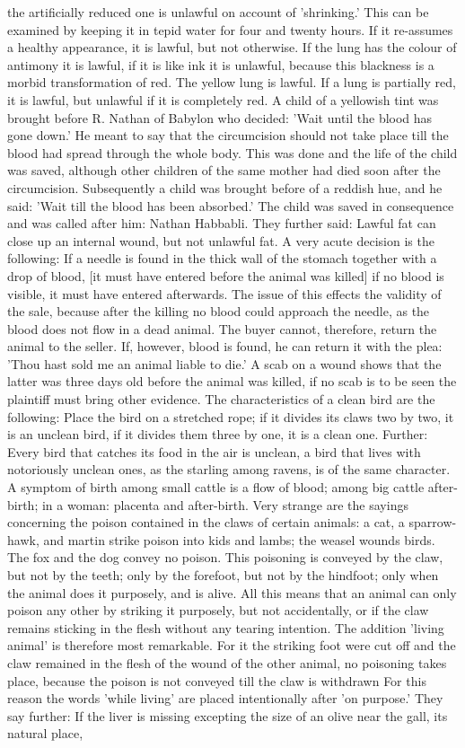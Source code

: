\documentclass[12pt]{article}
\begin{document}
the artificially reduced one is unlawful on account of 'shrinking.' This can be examined by keeping it in tepid water for four and twenty hours. If it re-assumes a healthy appearance, it is lawful, but not otherwise. If the lung has the colour of antimony it is lawful, if it is like ink it is unlawful, because this blackness is a morbid transformation of red. The yellow lung is lawful. If a lung is partially red, it is lawful, but unlawful if it is completely red. A child of a yellowish tint was brought before R. Nathan of Babylon who decided: 'Wait until the blood has gone down.' He meant to say that the circumcision should not take place till the blood had spread through the whole body. This was done and the life of the child was saved, although other children of the same mother had died soon after the circumcision. Subsequently a child was brought before of a reddish hue, and he said: 'Wait till the blood has been absorbed.' The child was saved in consequence and was called after him: Nathan Habbabli. They further said: Lawful fat can close up an internal wound, but not unlawful fat. A very acute decision is the following: If a needle is found in the thick wall of the stomach together with a drop of blood, [it must have entered before the animal was killed] if no blood is visible, it must have entered afterwards. The issue of this effects the validity of the sale, because after the killing no blood could approach the needle, as the blood does not flow in a dead animal. The buyer cannot, therefore, return the animal to the seller. If, however, blood is found, he can return it with the plea: 'Thou hast sold me an animal liable to die.' A scab on a wound shows that the latter was three days old before the animal was killed, if no scab is to be seen the plaintiff must bring other evidence. The characteristics of a clean bird are the following: Place the bird on a stretched rope; if it divides its claws two by two, it is an unclean bird, if it divides them three by one, it is a clean one. Further: Every bird that catches its food in the air is unclean, a bird that lives with notoriously unclean ones, as the starling among ravens, is of the same character. A symptom of birth among small cattle is a flow of blood; among big cattle after-birth; in a woman: placenta and after-birth. Very strange are the sayings concerning the poison contained in the claws of certain animals: a cat, a sparrow-hawk, and martin strike poison into kids and lambs; the weasel wounds birds. The fox and the dog convey no poison. This poisoning is conveyed by the claw, but not by the teeth; only by the forefoot, but not by the hindfoot; only when the animal does it purposely, and is alive. All this means that an animal can only poison any other by striking it purposely, but not accidentally, or if the claw remains sticking in the flesh without any tearing intention. The addition 'living animal' is therefore most remarkable. For it the striking foot were cut off and the claw remained in the flesh of the wound of the other animal, no poisoning takes place, because the poison is not conveyed till the claw is withdrawn For this reason the words 'while living' are placed intentionally after 'on purpose.' They say further: If the liver is missing excepting the size of an olive near the gall, its natural place, 
\end{document}
